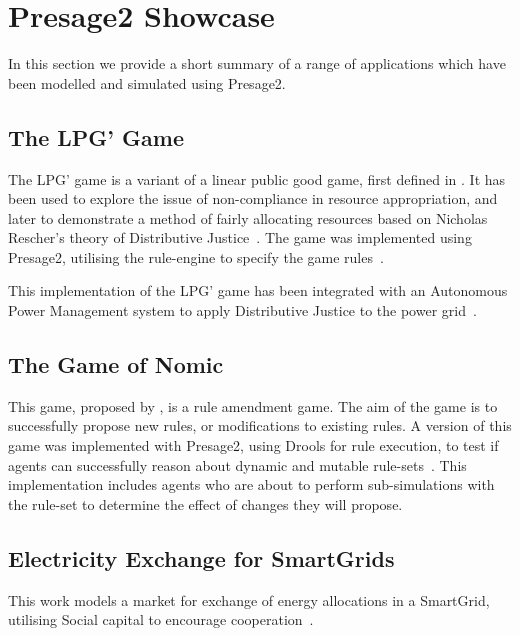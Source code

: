 \section{Presage2 Showcase}

In this section we provide a short summary of a range of applications which have
been modelled and simulated using Presage2.

\subsection{The LPG' Game}

The LPG' game is a variant of a linear public good game, first defined in
\citet{Pitt2012c}. It has been used to explore the issue of non-compliance in
resource appropriation, and later to demonstrate a method of fairly allocating
resources based on Nicholas Rescher's theory of Distributive
Justice~\citep{Pitt2014}. The game was implemented using Presage2, utilising
the rule-engine to specify the game rules~\citep{Macbeth2012}.

This implementation of the LPG' game has been integrated with an Autonomous
Power Management system to apply Distributive Justice to the power grid~\citep{Kohler2014}.


\subsection{The Game of Nomic}

This game, proposed by \citet{Suber1990}, is a rule amendment game. The aim of
the game is to successfully propose new rules, or modifications to existing
rules. A version of this game was implemented with Presage2, using Drools for
rule execution, to test if agents can successfully reason about dynamic and
mutable rule-sets~\citep{Holland2013}. This implementation includes agents who
are about to perform sub-simulations with the rule-set to determine the effect
of changes they will propose.

\subsection{Electricity Exchange for SmartGrids}

This work models a market for exchange of energy allocations in a SmartGrid,
utilising Social capital to encourage cooperation~\citep{Petruzzi2013}.

